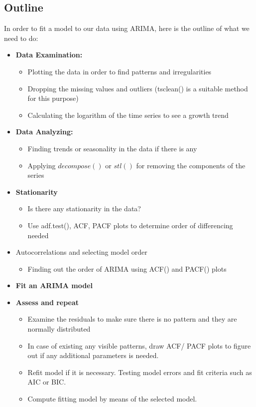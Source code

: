 \documentclass{article}
\begin{document}
\subsection{Outline}
In order to fit a model to our data using ARIMA, here is the outline of what we need to do:
\begin{itemize}
\item \textbf{Data Examination:}
\begin{itemize}
\item Plotting the data in order to find patterns and irregularities
\item Dropping the missing values and outliers (tsclean() is a suitable method for this purpose)
\item Calculating the logarithm of the time series to see a growth trend
\end{itemize}
\item \textbf{Data Analyzing:}
\begin{itemize}
\item Finding trends or seasonality in the data if there is any
\item Applying $decompose()$ or $stl()$ for removing the components of the series
\end{itemize}
\item \textbf{Stationarity}
\begin{itemize}
\item Is there any stationarity in the data?
\item Use adf.test(), ACF, PACF plots to determine order of differencing needed
\end{itemize}
\item Autocorrelations and selecting model order
\begin{itemize}
\item Finding out the order of ARIMA using ACF() and PACF() plots
\end{itemize}
\item \textbf{Fit an ARIMA model}
\item \textbf{Assess and repeat}
\begin{itemize}
\item Examine the  residuals to make sure there is no pattern and they are normally distributed
\item In case of existing any visible patterns, draw ACF/ PACF plots to figure out if any additional parameters is needed.
\item Refit model if it is necessary. Testing model errors and fit criteria such as AIC or BIC.
\item Compute fitting model by means of the selected model.
\end{itemize}
\end{itemize}
\end{document}
